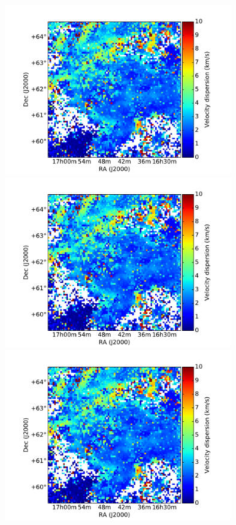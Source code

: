 \documentclass[traditabstract]{aa}
\begin{document}
\begin{figure}[h]
  \centering
  \includegraphics[page=1,height=7.5cm,trim=45 5 65 35,clip=true]{Figures/GHIGLS_disp.pdf}
  \hspace{3mm}
  \includegraphics[page=4,height=7.5cm,trim=45 5 65 35,clip=true]{Figures/GHIGLS_disp.pdf} \\
  \vspace{3mm}
  \includegraphics[page=2,height=7.5cm,trim=45 5 65 35,clip=true]{Figures/GHIGLS_disp.pdf}

\end{figure}
\end{document}
